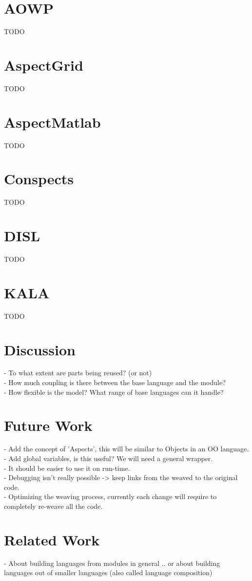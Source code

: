 \documentclass[a4paper]{report}
\begin{document}
\chapter{AOWP}
TODO

\chapter{AspectGrid}
TODO

\chapter{AspectMatlab}
TODO

\chapter{Conspects}
TODO

\chapter{DISL}
TODO

\chapter{KALA}
TODO


\chapter{Discussion}
- To what extent are parts being reused? (or not)\\
- How much coupling is there between the base language and the module?\\
- How flexible is the model? What range of base languages can it handle?
\chapter{Future Work}
- Add the concept of 'Aspects', this will be similar to Objects in an OO language.\\
- Add global variables, is this useful? We will need a general wrapper.\\
- It should be easier to use it on run-time.\\
- Debugging isn't really possible -> keep links from the weaved to the original code.\\
- Optimizing the weaving process, currently each change will require to completely re-weave all the code.\\
\chapter{Related Work}
- About building languages from modules in general .. or about building languages out of smaller languages (also called language composition)
\end{document}
